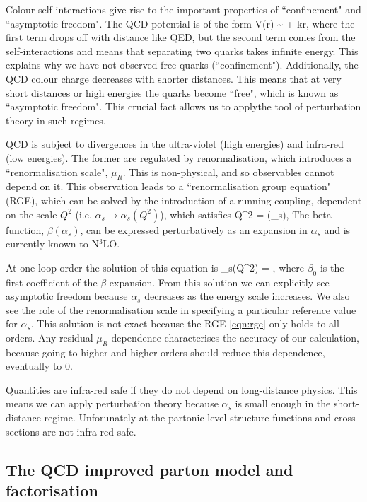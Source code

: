 Colour self-interactions give rise to the important properties of ``confinement" and ``asymptotic freedom". The QCD potential is of the form
\be 
V(r) \sim {} + kr,
\ee
where the first term drops off with distance like QED, but the second term comes from the self-interactions and means that separating two quarks takes infinite energy. This explains why we have not observed free quarks (``confinement"). Additionally, the QCD colour charge decreases with shorter distances. This means that at very short distances or high energies the quarks become ``free", which is known as ``asymptotic freedom". This crucial fact allows us to applythe tool of perturbation theory in such regimes. 

QCD is subject to divergences in the ultra-violet (high energies) and infra-red (low energies). The former are regulated by renormalisation, which introduces a ``renormalisation scale", $\mu_R$. This is non-physical, and so observables cannot depend on it. This observation leads to a ``renormalisation group equation" (RGE), which can be solved by the introduction of a running coupling, dependent on the scale $Q^2$ (i.e. $\alpha_s \to \alpha_s(Q^2)$), which satisfies
\be
\label{eqn:rge}
Q^2  = \beta (\alpha_s),
\ee
The beta function, $\beta(\alpha_s)$, can be expressed perturbatively as an expansion in $\alpha_s$ and is currently known to N$^3$LO.

At one-loop order the solution of this equation is
\be 
\alpha_s(Q^2) = ,
\ee
where $\beta_0$ is the first coefficient of the $\beta$ expansion. From this solution we can explicitly see asymptotic freedom because $\alpha_s$ decreases as the energy scale increases. We also see the role of the renormalisation scale in specifying a particular reference value for $\alpha_s$. This solution is not exact because the RGE \ref{eqn:rge} only holds to all orders. Any residual $\mu_R$ dependence characterises the accuracy of our calculation, because going to higher and higher orders should reduce this dependence, eventually to 0.

Quantities are infra-red safe if they do not depend on long-distance physics. This means we can apply perturbation theory because $\alpha_s$ is small enough in the short-distance regime. Unforunately at the partonic level structure functions and cross sections are not infra-red safe. 

\subsection{The QCD improved parton model and factorisation}

